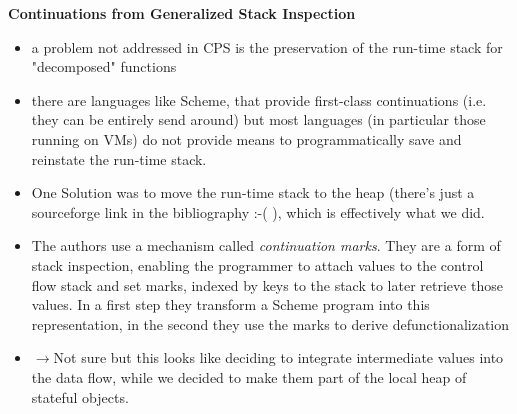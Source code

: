 \documentclass{scrartcl}
\newcommand{\means}{$\rightarrow{}$}
\begin{document}
\textbf{Continuations from Generalized Stack Inspection}\cite{}
\begin{itemize}
    \item a problem not addressed in CPS is the preservation of the run-time stack for "decomposed" functions
    \item there are languages like Scheme, that provide first-class continuations (i.e. they can be entirely send around) but most languages (in particular those running on VMs) do not provide means to programmatically save and reinstate the run-time stack. 
    \item One Solution was to move the run-time stack to the heap (there's just a sourceforge link in the bibliography :-( ), which is effectively what we did.
    \item The authors use a mechanism called \emph{continuation marks}. They are a form of stack inspection, enabling the programmer to attach values to the control flow stack and set marks, indexed by keys to the stack to later retrieve those values. In a first step they transform a Scheme program into this representation, in the second they use the marks to derive defunctionalization
    \item \means Not sure but this looks like deciding to integrate intermediate values into the data flow, while we decided to make them part of the local heap of stateful objects.
\end{itemize}
\end{document}
